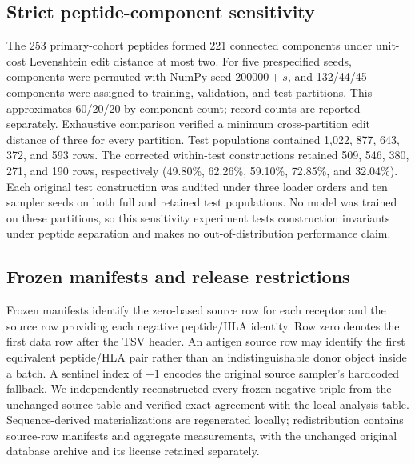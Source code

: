 \subsection{Strict peptide-component sensitivity}
The 253 primary-cohort peptides formed 221 connected components under unit-cost
Levenshtein edit distance at most two. For five prespecified seeds, components
were permuted with NumPy seed $200000+s$, and 132/44/45 components were assigned
to training, validation, and test partitions. This approximates 60/20/20 by
component count; record counts are reported separately. Exhaustive comparison
verified a minimum cross-partition edit distance of three for every partition.
Test populations contained 1,022, 877, 643, 372, and 593 rows. The corrected
within-test constructions retained 509, 546, 380, 271, and 190 rows, respectively
(49.80\%, 62.26\%, 59.10\%, 72.85\%, and 32.04\%). Each original test
construction was audited under three loader orders and ten sampler seeds on
both full and retained test populations. No model was trained on these
partitions, so this sensitivity experiment tests construction invariants under
peptide separation and makes no out-of-distribution performance claim.

\subsection{Frozen manifests and release restrictions}
Frozen manifests identify the zero-based source row for each receptor and the
source row providing each negative peptide/HLA identity. Row zero denotes the
first data row after the TSV header. An antigen source row may identify the
first equivalent peptide/HLA pair rather than an indistinguishable donor object
inside a batch. A sentinel index of $-1$ encodes the original source sampler's
hardcoded fallback. We independently reconstructed every frozen negative triple
from the unchanged source table and verified exact agreement with the local
analysis table. Sequence-derived materializations are regenerated locally;
redistribution contains source-row manifests and aggregate measurements, with
the unchanged original database archive and its license retained separately.

